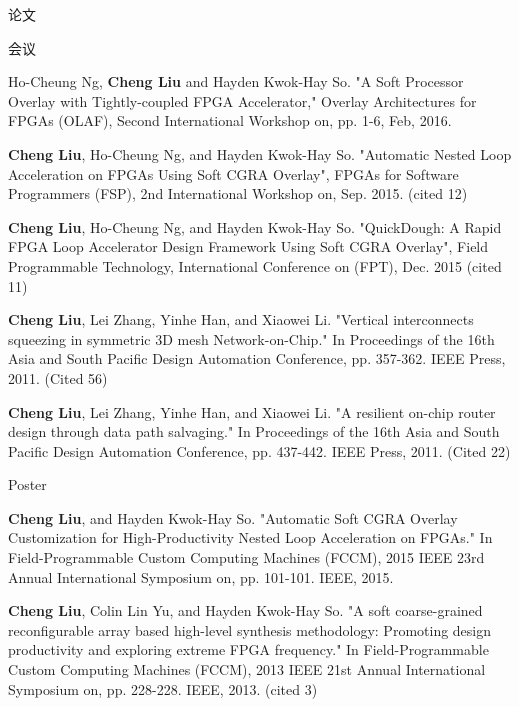 \documentclass{resume} %
\begin{document}
\begin{rSection}{论文}
    \begin{rSubsection} {会议}{}{}{}
    \item Ho-Cheung Ng, \textbf{Cheng Liu} and Hayden Kwok-Hay So. "A Soft Processor Overlay with
        Tightly-coupled FPGA Accelerator," Overlay Architectures for FPGAs (OLAF), Second
        International Workshop on, pp. 1-6, Feb, 2016. 
    \item \textbf{Cheng Liu}, Ho-Cheung Ng, and Hayden Kwok-Hay So. "Automatic Nested Loop Acceleration on
        FPGAs Using Soft CGRA Overlay", FPGAs for Software Programmers (FSP), 2nd International
        Workshop on, Sep. 2015. (cited 12)
    \item \textbf{Cheng Liu}, Ho-Cheung Ng, and Hayden Kwok-Hay So. "QuickDough: A Rapid FPGA Loop
        Accelerator Design Framework Using Soft CGRA Overlay", Field Programmable Technology,
        International Conference on (FPT), Dec. 2015 (cited 11) 
    \item \textbf{Cheng Liu}, Lei Zhang, Yinhe Han, and Xiaowei Li. "Vertical interconnects squeezing in
        symmetric 3D mesh Network-on-Chip." In Proceedings of the 16th Asia and South Pacific Design
        Automation Conference, pp. 357-362. IEEE Press, 2011. (Cited 56)
    \item \textbf{Cheng Liu}, Lei Zhang, Yinhe Han, and Xiaowei Li. "A resilient on-chip router design
        through data path salvaging." In Proceedings of the 16th Asia and South Pacific Design
        Automation Conference, pp. 437-442. IEEE Press, 2011. (Cited 22)
    \end{rSubsection}

    \begin{rSubsection} {Poster}{}{}{}
    \item \textbf{Cheng Liu}, and Hayden Kwok-Hay So. "Automatic Soft CGRA Overlay Customization for
        High-Productivity Nested Loop Acceleration on FPGAs." In Field-Programmable Custom Computing
        Machines (FCCM), 2015 IEEE 23rd Annual International Symposium on, pp. 101-101. IEEE, 2015.
    \item \textbf{Cheng Liu}, Colin Lin Yu, and Hayden Kwok-Hay So. "A soft coarse-grained reconfigurable
        array based high-level synthesis methodology: Promoting design productivity and exploring
        extreme FPGA frequency." In Field-Programmable Custom Computing Machines (FCCM), 2013 IEEE
        21st Annual International Symposium on, pp. 228-228. IEEE, 2013. (cited 3)
    \end{rSubsection}

\end{rSection}
\end{document}
